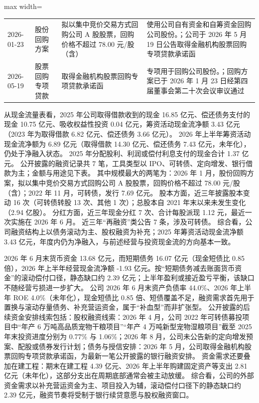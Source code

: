 \begin{center}
\begin{adjustbox}{max width=\textwidth}
\begin{tabular}{@{}p{1.45cm}p{2.55cm}p{4.05cm}p{4.95cm}@{}}
2026-01-23 & 股份回购方案 & 拟以集中竞价交易方式回购公司 A 股股票，\allowbreak{}回购价格不超过 78.00 元/\allowbreak{}股（含） & 使用公司自有资金和自筹资金回购公司股份。；公司于 2026 年 5 月 19 日公告取得金融机构股票回购专项贷款承诺函 \\
2026-05-19 & 股票回购专项贷款 & 取得金融机构股票回购专项贷款承诺函 & 专项用于回购公司股份。；回购方案已于 2026 年 1 月 23 日经第四届董事会第二十次会议审议通过 \\
\bottomrule
\end{tabular}
\end{adjustbox}
\end{center}

 从现金流量表看，2025 年公司取得借款收到的现金 16.85 亿元、偿还债务支付的现金 10.75 亿元、吸收权益性投资 0.04 亿元，筹资活动现金流净额 3.43 亿元（2023 年为取得借款 6.82 亿元、偿还债务 3.66 亿元）。 2026 年上半年筹资活动现金流净额为 6.89 亿元（取得借款 14.30 亿元、偿还债务 7.43 亿元，未年化），仍处于净融入状态。 2025 年分配股利、利润或偿付利息支付的现金合计 1.37 亿元。 公开披露的融资记录共 7 笔，工具类型以 IPO、可转债、定向增发、银行借款为主；金额与用途见下表。 其中规模最大的两笔为：2026 年 1 月，股份回购方案，拟以集中竞价交易方式回购公司 A 股股票，回购价格不超过 78.00 元/股（含）；2022 年 11 月，可转债，发行 7.69 亿元。 股本方面，近三年披露股本变动 16 次（可转债转股 13 次、其他 1 次）；总股本自 2021 年末以来未发生变化（2.94 亿股）。 分红方面，近三年现金分红 7 次、合计每股派现 1.12 元，最近一次实施在 2026 年 6 月。 近三年“再融资”类公告 7 条，涉及可转债。 综合看，公司融资结构上以债务滚动为主、股权融资为补充；2025 年筹资活动现金流净额 3.43 亿元，年度内仍为净融入，与前述经营与投资现金流的方向基本一致。

 2026 年 6 月末货币资金 13.68 亿元，而短期债务 16.07 亿元（现金短债比 0.85 倍），2026 年上半年经营现金流净额 -1.93 亿元。按“短期债务减去账面货币资金”的滚动偿付口径，静态缺口约 2.39 亿元；上半年盈利或接近盈亏平衡，该缺口不随经营亏损进一步扩大。 公司 2026 年 6 月末资产负债率 44.0\%、2026 年上半年 ROE 4.0\%（未年化），现金短债比 0.85 倍、短债覆盖不足，融资需求首先用于置换与滚动存量债务、补充营运资金，属于“补血型”而非扩张型。 公开披露的后续资金安排线索包括：股权融资线索：2026 年 4 月，公司 2022 年可转债募投项目中“年产 6 万吨高品质宠物干粮项目”“年产 4 万吨新型宠物湿粮项目”截至 2025 年末投资进度分别为 0.77\% 与 1.06\%；2026 年 8 月，公司未公告新的定向增发预案、配股或债券发行计划；债务与授信安排：2026 年 5 月，公司取得金融机构股票回购专项贷款承诺函，为最新一笔公开披露的银行融资安排。 资金需求还要叠加在建工程：期末在建工程 4.39 亿元、2026 年上半年购建固定资产等支出 2.81 亿元（未年化），这部分支出在周期底部通常会被主动放缓。 综合看，公司的外部资金需求以补充营运资金为主、项目投入为辅，滚动偿付口径下的静态缺口约 2.39 亿元，融资节奏将受制于银行续贷意愿与股权融资窗口。




